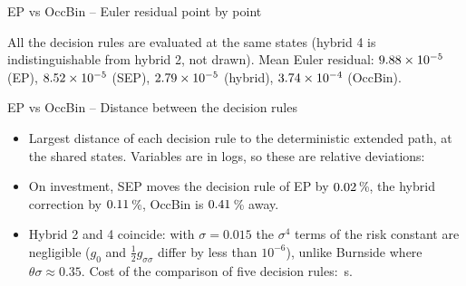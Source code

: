 \documentclass[11pt,aspectratio=169]{beamer}
\begin{document}
\begin{frame}{EP vs OccBin -- Euler residual point by point}

\begin{center}
\end{center}

\vspace*{-0.2cm}
All the decision rules are evaluated at the same states (hybrid 4 is indistinguishable from hybrid 2, not drawn). Mean Euler residual: $9.88\times10^{-5}$ (EP), $8.52\times10^{-5}$ (SEP), $2.79\times10^{-5}$ (hybrid), $3.74\times10^{-4}$ (OccBin).

\end{frame}

\begin{frame}{EP vs OccBin -- Distance between the decision rules}

\begin{itemize}

\item Largest distance of each decision rule to the deterministic extended path, at the shared states. Variables are in logs, so these are relative deviations:
\begin{center}
\small
\renewcommand{\arraystretch}{1.15}

\end{center}

\item On investment, SEP moves the decision rule of EP by $0.02$\,\%, the hybrid correction by $0.11$\,\%, OccBin is $0.41$\,\% away.\newline

\item Hybrid 2 and 4 coincide: with $\sigma=0.015$ the $\sigma^4$ terms of the risk constant are negligible ($g_0$ and $\frac12 g_{\sigma\sigma}$ differ by less than $10^{-6}$), unlike Burnside where $\theta\sigma\approx0.35$. Cost of the comparison of five decision rules: \irrElapsed\,s.

\end{itemize}

\end{frame}
\end{document}
